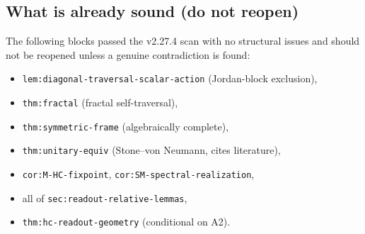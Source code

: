 \subsection*{What is already sound (do not reopen)}

The following blocks passed the v2.27.4 scan with no structural issues and
should not be reopened unless a genuine contradiction is found:
\begin{itemize}[leftmargin=1.8em]
\item \texttt{lem:diagonal-traversal-scalar-action} (Jordan-block exclusion),
\item \texttt{thm:fractal} (fractal self-traversal),
\item \texttt{thm:symmetric-frame} (algebraically complete),
\item \texttt{thm:unitary-equiv} (Stone--von Neumann, cites literature),
\item \texttt{cor:M-HC-fixpoint}, \texttt{cor:SM-spectral-realization},
\item all of \texttt{sec:readout-relative-lemmas},
\item \texttt{thm:hc-readout-geometry} (conditional on A2).
\end{itemize}


